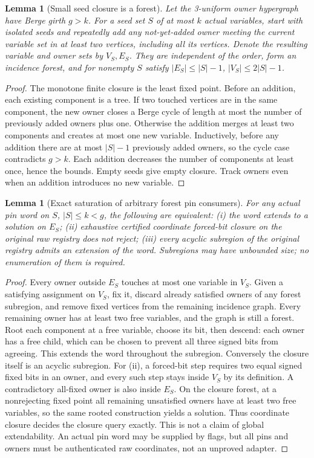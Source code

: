 \documentclass[11pt]{article}
\newtheorem{lemma}[theorem]{Lemma}
\begin{document}
\begin{lemma}[Small seed closure is a forest]\label{lem:do20-closure}
Let the 3-uniform owner hypergraph have Berge girth $g>k$. For a seed set $S$ of at most $k$ actual variables, start with isolated seeds and repeatedly add any not-yet-added owner meeting the current variable set in at least two vertices, including all its vertices. Denote the resulting variable and owner sets by $V_S,E_S$. They are independent of the order, form an incidence forest, and for nonempty $S$ satisfy $|E_S|\le |S|-1$, $|V_S|\le2|S|-1$.
\end{lemma}
\begin{proof}
The monotone finite closure is the least fixed point. Before an addition, each existing component is a tree. If two touched vertices are in the same component, the new owner closes a Berge cycle of length at most the number of previously added owners plus one. Otherwise the addition merges at least two components and creates at most one new variable. Inductively, before any addition there are at most $|S|-1$ previously added owners, so the cycle case contradicts $g>k$. Each addition decreases the number of components at least once, hence the bounds. Empty seeds give empty closure. Track owners even when an addition introduces no new variable.
\end{proof}
\begin{lemma}[Exact saturation of arbitrary forest pin consumers]\label{lem:do20-forest}
For any actual pin word on $S$, $|S|\le k<g$, the following are equivalent: (i) the word extends to a solution on $E_S$; (ii) exhaustive certified coordinate forced-bit closure on the original raw registry does not reject; (iii) every acyclic subregion of the original registry admits an extension of the word. Subregions may have unbounded size; no enumeration of them is required.
\end{lemma}
\begin{proof}
Every owner outside $E_S$ touches at most one variable in $V_S$. Given a satisfying assignment on $V_S$, fix it, discard already satisfied owners of any forest subregion, and remove fixed vertices from the remaining incidence graph. Every remaining owner has at least two free variables, and the graph is still a forest. Root each component at a free variable, choose its bit, then descend: each owner has a free child, which can be chosen to prevent all three signed bits from agreeing. This extends the word throughout the subregion. Conversely the closure itself is an acyclic subregion. For (ii), a forced-bit step requires two equal signed fixed bits in an owner, and every such step stays inside $V_S$ by its definition. A contradictory all-fixed owner is also inside $E_S$. On the closure forest, at a nonrejecting fixed point all remaining unsatisfied owners have at least two free variables, so the same rooted construction yields a solution. Thus coordinate closure decides the closure query exactly. This is not a claim of global extendability. An actual pin word may be supplied by flags, but all pins and owners must be authenticated raw coordinates, not an unproved adapter.
\end{proof}
\end{document}
